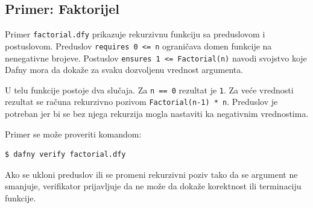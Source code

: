 \subsection{Primer: Faktorijel}\label{primer-faktorijel}

Primer \texttt{factorial.dfy} prikazuje rekurzivnu funkciju sa preduslovom i postuslovom. Preduslov \texttt{requires\ 0\ <=\ n} ograničava domen funkcije na nenegativne brojeve. Postuslov \texttt{ensures\ 1\ <=\ Factorial(n)} navodi svojstvo koje Dafny mora da dokaže za svaku dozvoljenu vrednost argumenta.


U telu funkcije postoje dva slučaja. Za \texttt{n\ ==\ 0} rezultat je \texttt{1}. Za veće vrednosti rezultat se računa rekurzivno pozivom \texttt{Factorial(n-1) * n}. Preduslov je potreban jer bi se bez njega rekurzija mogla nastaviti ka negativnim vrednostima.

Primer se može proveriti komandom:

\begin{verbatim}
$ dafny verify factorial.dfy
\end{verbatim}

Ako se ukloni preduslov ili se promeni rekurzivni poziv tako da se argument ne smanjuje, verifikator prijavljuje da ne može da dokaže korektnost ili terminaciju funkcije.

